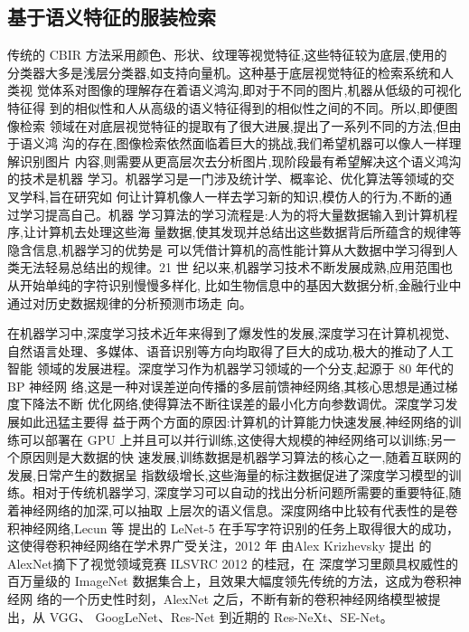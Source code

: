 \subsection{基于语义特征的服装检索}
传统的 CBIR 方法采用颜色、形状、纹理等视觉特征,这些特征较为底层,使用的
分类器大多是浅层分类器,如支持向量机。这种基于底层视觉特征的检索系统和人类视
觉体系对图像的理解存在着语义鸿沟,即对于不同的图片,机器从低级的可视化特征得
到的相似性和人从高级的语义特征得到的相似性之间的不同\cite{卢兴敬2008基于内容的服装图像检索技术研究及实现}。所以,即便图像检索
领域在对底层视觉特征的提取有了很大进展,提出了一系列不同的方法,但由于语义鸿
沟的存在,图像检索依然面临着巨大的挑战,我们希望机器可以像人一样理解识别图片
内容,则需要从更高层次去分析图片,现阶段最有希望解决这个语义鸿沟的技术是机器
学习。机器学习是一门涉及统计学、概率论、优化算法等领域的交叉学科,旨在研究如
何让计算机像人一样去学习新的知识,模仿人的行为,不断的通过学习提高自己。机器
学习算法的学习流程是:人为的将大量数据输入到计算机程序,让计算机去处理这些海
量数据,使其发现并总结出这些数据背后所蕴含的规律等隐含信息,机器学习的优势是
可以凭借计算机的高性能计算从大数据中学习得到人类无法轻易总结出的规律。21 世
纪以来,机器学习技术不断发展成熟,应用范围也从开始单纯的字符识别慢慢多样化,
比如生物信息中的基因大数据分析,金融行业中通过对历史数据规律的分析预测市场走
向。

在机器学习中,深度学习技术近年来得到了爆发性的发展,深度学习在计算机视觉、
自然语言处理、多媒体、语音识别等方向均取得了巨大的成功,极大的推动了人工智能
领域的发展进程。深度学习作为机器学习领域的一个分支,起源于 80 年代的 BP \cite{rumelhart1988learning}神经网
络,这是一种对误差逆向传播的多层前馈神经网络,其核心思想是通过梯度下降法不断
优化网络,使得算法不断往误差的最小化方向参数调优。深度学习发展如此迅猛主要得
益于两个方面的原因:计算机的计算能力快速发展,神经网络的训练可以部署在 GPU
上并且可以并行训练,这使得大规模的神经网络可以训练;另一个原因则是大数据的快
速发展,训练数据是机器学习算法的核心之一,随着互联网的发展,日常产生的数据呈
指数级增长,这些海量的标注数据促进了深度学习模型的训练。相对于传统机器学习,
深度学习可以自动的找出分析问题所需要的重要特征,随着神经网络的加深,可以抽取
上层次的语义信息。深度网络中比较有代表性的是卷积神经网络,Lecun 等 提出的
LeNet-5\cite{lecun1998gradient} 在手写字符识别的任务上取得很大的成功，这使得卷积神经网络在学术界广受关注，2012
年 由Alex Krizhevsky 提出 的AlexNet\cite{krizhevsky2012imagenet}摘下了视觉领域竞赛 ILSVRC 2012 的桂冠，在
深度学习里颇具权威性的百万量级的 ImageNet\cite{deng2009imagenet} 数据集合上，且效果大幅度领先传统的方法，这成为卷积神经网
络的一个历史性时刻，AlexNet 之后，不断有新的卷积神经网络模型被提出，从 VGG\cite{simonyan2014very}、
GoogLeNet\cite{szegedy2015going}、Res-Net\cite{he2016deep} 到近期的 Res-NeXt\cite{xie2017aggregated}、SE-Net\cite{hu2018squeeze}。

